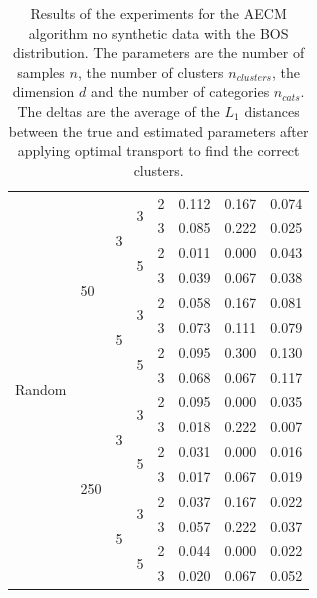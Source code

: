 \begin{table}[H]
\begin{minipage}{.48\columnwidth}
\begin{adjustbox}{width=\columnwidth}
\begin{tabular}{lllllrrr}
\cline{1-8} \cline{2-8} \cline{3-8} \cline{4-8}
\multirow[t]{16}{*}{Random} & \multirow[t]{8}{*}{50} & \multirow[t]{4}{*}{3} & \multirow[t]{2}{*}{3} & 2 & 0.112 & 0.167 & 0.074 \\
 &  &  &  & 3 & 0.085 & 0.222 & 0.025 \\
\cline{4-8}
 &  &  & \multirow[t]{2}{*}{5} & 2 & 0.011 & 0.000 & 0.043 \\
 &  &  &  & 3 & 0.039 & 0.067 & 0.038 \\
\cline{3-8} \cline{4-8}
 &  & \multirow[t]{4}{*}{5} & \multirow[t]{2}{*}{3} & 2 & 0.058 & 0.167 & 0.081 \\
 &  &  &  & 3 & 0.073 & 0.111 & 0.079 \\
\cline{4-8}
 &  &  & \multirow[t]{2}{*}{5} & 2 & 0.095 & 0.300 & 0.130 \\
 &  &  &  & 3 & 0.068 & 0.067 & 0.117 \\
\cline{2-8} \cline{3-8} \cline{4-8}
 & \multirow[t]{8}{*}{250} & \multirow[t]{4}{*}{3} & \multirow[t]{2}{*}{3} & 2 & 0.095 & 0.000 & 0.035 \\
 &  &  &  & 3 & 0.018 & 0.222 & 0.007 \\
\cline{4-8}
 &  &  & \multirow[t]{2}{*}{5} & 2 & 0.031 & 0.000 & 0.016 \\
 &  &  &  & 3 & 0.017 & 0.067 & 0.019 \\
\cline{3-8} \cline{4-8}
 &  & \multirow[t]{4}{*}{5} & \multirow[t]{2}{*}{3} & 2 & 0.037 & 0.167 & 0.022 \\
 &  &  &  & 3 & 0.057 & 0.222 & 0.037 \\
\cline{4-8}
 &  &  & \multirow[t]{2}{*}{5} & 2 & 0.044 & 0.000 & 0.022 \\
 &  &  &  & 3 & 0.020 & 0.067 & 0.052 \\
\cline{1-8} \cline{2-8} \cline{3-8} \cline{4-8}
\bottomrule
\end{tabular}
\end{adjustbox}
\caption{Results of the experiments for the AECM algorithm no synthetic data with the BOS distribution. The parameters are the number of samples $n$, the number of clusters $n_{clusters}$, the dimension $d$ and the number of categories $n_{cats}$. The deltas are the average of the $L_1$ distances between the true and estimated parameters after applying optimal transport to find the correct clusters.}
\label{tab:results_bos}
\end{minipage} \hspace{.02\columnwidth}%
\begin{minipage}{.48\columnwidth}
\centering

\end{minipage}
\end{table}
